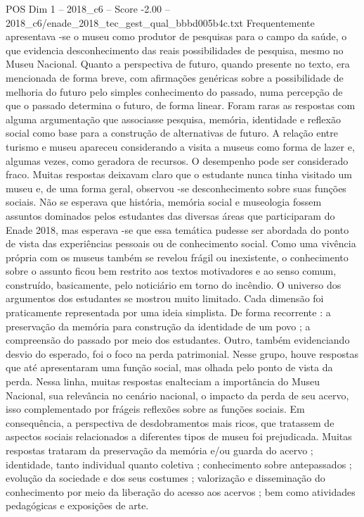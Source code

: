 \begin{textsample}{POS Dim 1 – 2018\_c6 – Score -2.00 – 2018\_c6/enade\_2018\_tec\_gest\_qual\_bbbd005b4c.txt}
Frequentemente apresentava -se o museu como produtor de pesquisas para o campo da saúde, o que evidencia desconhecimento das reais possibilidades de pesquisa, mesmo no Museu Nacional.
Quanto a perspectiva de futuro, quando presente no texto, era mencionada de forma breve, com afirmações genéricas sobre a possibilidade de melhoria do futuro pelo simples conhecimento do passado, numa percepção de que o passado determina o futuro, de forma linear.
Foram raras as respostas com alguma argumentação que associasse pesquisa, memória, identidade e reflexão social como base para a construção de alternativas de futuro.
A relação entre turismo e museu apareceu considerando a visita a museus como forma de lazer e, algumas vezes, como geradora de recursos.
O desempenho pode ser considerado fraco.
Muitas respostas deixavam claro que o estudante nunca tinha visitado um museu e, de uma forma geral, observou -se desconhecimento sobre suas funções sociais.
Não se esperava que história, memória social e museologia fossem assuntos dominados pelos estudantes das diversas áreas que participaram do Enade 2018, mas esperava -se que essa temática pudesse ser abordada do ponto de vista das experiências pessoais ou de conhecimento social.
Como uma vivência própria com os museus também se revelou frágil ou inexistente, o conhecimento sobre o assunto ficou bem restrito aos textos motivadores e ao senso comum, construído, basicamente, pelo noticiário em torno do incêndio.
O universo dos argumentos dos estudantes se mostrou muito limitado.
Cada dimensão foi praticamente representada por uma ideia simplista.
De forma recorrente : a preservação da memória para construção da identidade de um povo ; a compreensão do passado por meio dos estudantes.
Outro, também evidenciando desvio do esperado, foi o foco na perda patrimonial.
Nesse grupo, houve respostas que até apresentaram uma função social, mas olhada pelo ponto de vista da perda.
Nessa linha, muitas respostas enalteciam a importância do Museu Nacional, sua relevância no cenário nacional, o impacto da perda de seu acervo, isso complementado por frágeis reflexões sobre as funções sociais.
Em consequência, a perspectiva de desdobramentos mais ricos, que tratassem de aspectos sociais relacionados a diferentes tipos de museu foi prejudicada.
Muitas respostas trataram da preservação da memória e/ou guarda do acervo ; identidade, tanto individual quanto coletiva ; conhecimento sobre antepassados ; evolução da sociedade e dos seus costumes ; valorização e disseminação do conhecimento por meio da liberação do acesso aos acervos ; bem como atividades pedagógicas e exposições de arte.

\end{textsample}
